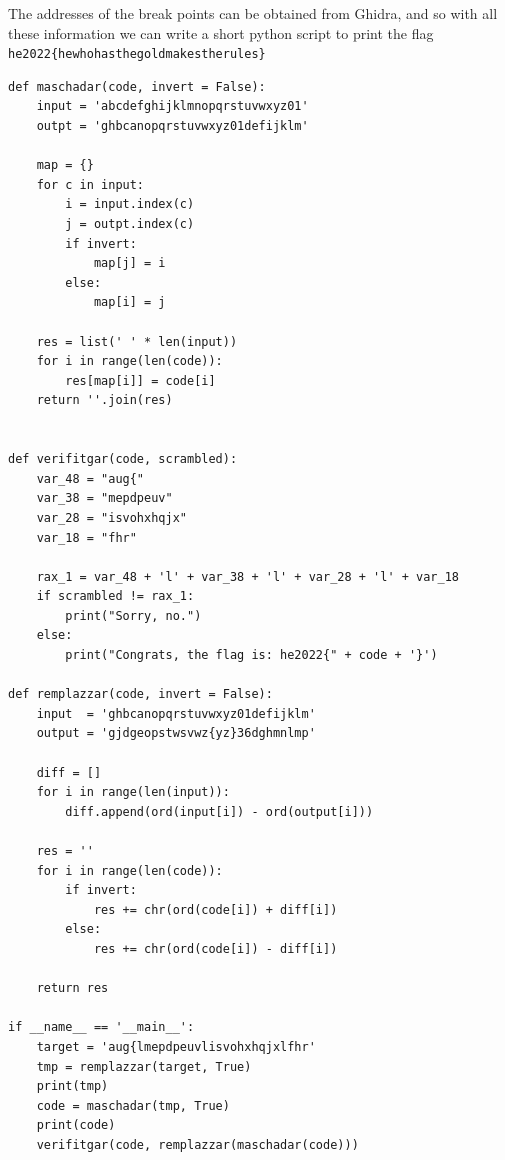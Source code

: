 The addresses of the break points can be obtained from Ghidra, and so with all these information we can write a short python script to print the flag \verb+he2022{hewhohasthegoldmakestherules}+
{\small
\begin{verbatim}
def maschadar(code, invert = False):
    input = 'abcdefghijklmnopqrstuvwxyz01'
    outpt = 'ghbcanopqrstuvwxyz01defijklm'

    map = {}
    for c in input:
        i = input.index(c)
        j = outpt.index(c)
        if invert:
            map[j] = i
        else:
            map[i] = j

    res = list(' ' * len(input))
    for i in range(len(code)):
        res[map[i]] = code[i]
    return ''.join(res)


def verifitgar(code, scrambled):
    var_48 = "aug{"
    var_38 = "mepdpeuv"
    var_28 = "isvohxhqjx"
    var_18 = "fhr"

    rax_1 = var_48 + 'l' + var_38 + 'l' + var_28 + 'l' + var_18
    if scrambled != rax_1:
        print("Sorry, no.")
    else:
        print("Congrats, the flag is: he2022{" + code + '}')

def remplazzar(code, invert = False):
    input  = 'ghbcanopqrstuvwxyz01defijklm'
    output = 'gjdgeopstwsvwz{yz}36dghmnlmp'

    diff = []
    for i in range(len(input)):
        diff.append(ord(input[i]) - ord(output[i]))

    res = ''
    for i in range(len(code)):
        if invert:
            res += chr(ord(code[i]) + diff[i])
        else:
            res += chr(ord(code[i]) - diff[i])
    
    return res

if __name__ == '__main__':
    target = 'aug{lmepdpeuvlisvohxhqjxlfhr'
    tmp = remplazzar(target, True)
    print(tmp)
    code = maschadar(tmp, True)
    print(code)
    verifitgar(code, remplazzar(maschadar(code)))

\end{verbatim}
}




	









